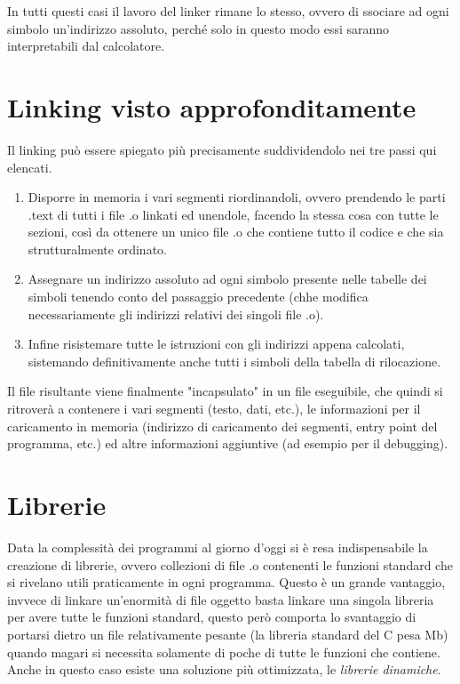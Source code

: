 \documentclass[class=book, crop=false, oneside]{standalone}
\begin{document}
In tutti questi casi il lavoro del linker rimane lo stesso, ovvero di ssociare ad ogni simbolo un'indirizzo assoluto, perché solo in questo modo essi saranno interpretabili dal calcolatore.

\section{Linking visto approfonditamente}
Il linking può essere spiegato più precisamente suddividendolo nei tre passi qui elencati.
\begin{enumerate}
	\item Disporre in memoria i vari segmenti riordinandoli, ovvero prendendo le parti .text di tutti i file .o linkati ed unendole, facendo la stessa cosa con tutte le sezioni, così da ottenere un unico file .o che contiene tutto il codice e che sia strutturalmente ordinato.
	\item Assegnare un indirizzo assoluto ad ogni simbolo presente nelle tabelle dei simboli tenendo conto del passaggio precedente (chhe modifica necessariamente gli indirizzi relativi dei singoli file .o).
	\item Infine risistemare tutte le istruzioni con gli indirizzi appena calcolati, sistemando definitivamente anche tutti i simboli della tabella di rilocazione.
\end{enumerate}

Il file risultante viene finalmente "incapsulato" in un file eseguibile, che quindi si ritroverà a contenere i vari segmenti (testo, dati, etc.), le informazioni per il caricamento in memoria (indirizzo di caricamento dei segmenti, entry point del programma, etc.) ed altre informazioni aggiuntive (ad esempio per il debugging).

\section{Librerie}
Data la complessità dei programmi al giorno d'oggi si è resa indispensabile la creazione di librerie, ovvero collezioni di file .o contenenti le funzioni standard che si rivelano utili praticamente in ogni  programma.
Questo è un grande vantaggio, invvece di linkare un'enormità di file oggetto basta linkare una singola libreria per avere tutte le funzioni standard, questo però comporta lo svantaggio di portarsi dietro un file relativamente pesante (la libreria standard del C pesa \unit[2,5]{Mb}) quando magari si necessita solamente di poche di tutte le funzioni che contiene.
Anche in questo caso esiste una soluzione più ottimizzata, le \emph{librerie dinamiche}.
\end{document}

